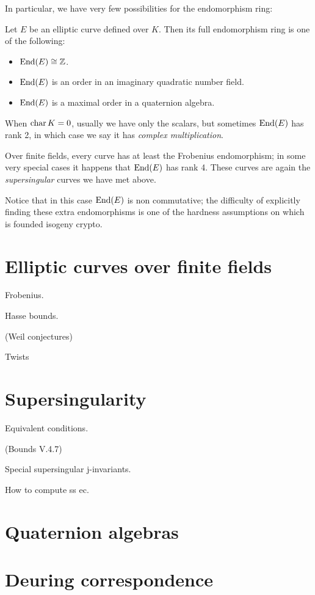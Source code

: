 In particular, we have very few possibilities for the endomorphism ring:
\begin{theorem}
    Let $E$ be an elliptic curve defined over $K$. Then its full endomorphism ring is one of the following:
    \begin{itemize}
        \item $\operatorname{End}(E)\cong\mathbb{Z}$.
        \item $\operatorname{End}(E)$ is an order in an imaginary quadratic number field.
        \item $\operatorname{End}(E)$ is a maximal order in a quaternion algebra.
    \end{itemize}
\end{theorem}

When $\operatorname{char} K=0$, usually we have only the scalars, but sometimes $\operatorname{End}(E)$ has rank 2, in which case we say it has \emph{complex multiplication}.

Over finite fields, every curve has at least the Frobenius endomorphism; in some very special cases it happens that $\operatorname{End}(E)$ has rank 4. These curves are again the \emph{supersingular} curves we have met above.

Notice that in this case $\operatorname{End}(E)$ is non commutative; the difficulty of explicitly finding these extra endomorphisms is one of the hardness assumptions on which is founded isogeny crypto.


\section{Elliptic curves over finite fields}

Frobenius.

Hasse bounds.

(Weil conjectures)

Twists

\section{Supersingularity}

Equivalent conditions.

(Bounds V.4.7)

Special supersingular j-invariants.

How to compute ss ec.

\section{Quaternion algebras}

\section{Deuring correspondence}


